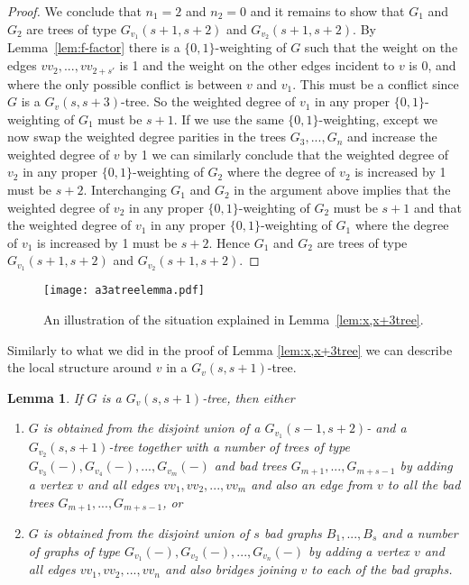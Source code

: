 \documentclass[
final,
 nomarks,
]{dmtcs-episciences}
\newtheorem{lemma}[theorem]{Lemma}
\theoremstyle{definition}
\begin{document}
\begin{proof}
We conclude that $n_1=2$ and $n_2=0$ and it remains to show that $G_1$ and $G_2$ are trees of type $G_{v_1}(s+1,s+2)$ and $G_{v_{2}}(s+1,s+2)$. By Lemma~\ref{lem:f-factor} there is a $\{0,1\}$-weighting of $G$ such that the weight on the edges $vv_2,...,vv_{2+s'}$ is 1 and the weight on the other edges incident to $v$ is 0, and where the only possible conflict is between $v$ and $v_1$. This must be a conflict since $G$ is a $G_v(s,s+3)$-tree. So the weighted degree of $v_1$ in any proper $\{0,1\}$-weighting of $G_1$ must be $s+1$. If we use the same $\{0,1\}$-weighting, except we now swap the weighted degree parities in the trees $G_3,...,G_n$  and increase the weighted degree of $v$ by 1 we can similarly conclude that the weighted degree of $v_2$ in any proper $\{0,1\}$-weighting of $G_2$ where the degree of $v_2$ is increased by 1 must be $s+2$. Interchanging $G_1$ and $G_2$ in the argument above implies that the weighted degree of $v_2$ in any proper $\{0,1\}$-weighting of $G_2$ must be $s+1$ and that the weighted degree of $v_1$ in any proper $\{0,1\}$-weighting of $G_1$ where the degree of $v_1$ is increased by 1 must be $s+2$. Hence $G_1$ and $G_2$ are trees of type $G_{v_1}(s+1,s+2)$ and $G_{v_{2}}(s+1,s+2)$.
\end{proof}
\begin{figure} [H]
\centering
\texttt{[image: a3atreelemma.pdf]}
\caption{An illustration of the situation explained in Lemma~\ref{lem:x,x+3tree}.}
\label{fig:a3atreelemma}
\end{figure}
\noindent Similarly to what we did in the proof of Lemma \ref{lem:x,x+3tree} we can describe the local structure around $v$ in a $G_v(s,s+1)$-tree.
\begin{lemma}\label{lem:x,x+1-tree}
If $G$ is a $G_v(s,s+1)$-tree, then either
\begin{enumerate}[label=(\alph*)]
\item $G$ is obtained from the disjoint union of a $G_{v_1}(s-1,s+2)$- and a $G_{v_2}(s,s+1)$-tree together with a number of trees of type $G_{v_3}(-), G_{v_4}(-),...,G_{v_m}(-)$ and bad trees $G_{m+1},...,G_{m+s-1}$ by adding a vertex $v$ and all edges $vv_1, vv_2, ..., vv_m$ and also an edge from $v$ to all the bad trees $G_{m+1},...,G_{m+s-1}$, or
\item  $G$ is obtained from the disjoint union of $s$ bad graphs $B_1, ..., B_s$ and a number of graphs of type $G_{v_1}(-), G_{v_2}(-),...,G_{v_n}(-)$  by adding a vertex $v$ and all edges $vv_1, vv_2, ..., vv_n$ and also bridges joining $v$ to each of the bad graphs.
\end{enumerate}
\end{lemma}
\end{document}
